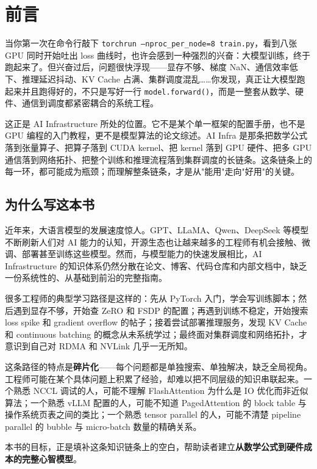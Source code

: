 \chapter*{前言}

当你第一次在命令行敲下 \texttt{torchrun --nproc\_per\_node=8 train.py}，看到八张 GPU 同时开始吐出 loss 曲线时，也许会感到一种强烈的兴奋：大模型训练，终于跑起来了。但兴奋过后，问题很快浮现——显存不够、梯度 NaN、通信效率低下、推理延迟抖动、KV Cache 占满、集群调度混乱……你发现，真正让大模型跑起来并且跑得好的，不只是写好一行 \texttt{model.forward()}，而是一整套从数学、硬件、通信到调度都紧密耦合的系统工程。

这正是 AI Infrastructure 所处的位置。它不是某个单一框架的配置手册，也不是 GPU 编程的入门教程，更不是模型算法的论文综述。AI Infra 是那条把数学公式落到张量算子、把算子落到 CUDA kernel、把 kernel 落到 GPU 硬件、把多 GPU 通信落到网络拓扑、把整个训练和推理流程落到集群调度的长链条。这条链条上的每一环，都可能成为瓶颈；而理解整条链条，才是从"能用"走向"好用"的关键。

\section*{为什么写这本书}

近年来，大语言模型的发展速度惊人。GPT、LLaMA、Qwen、DeepSeek 等模型不断刷新人们对 AI 能力的认知，开源生态也让越来越多的工程师有机会接触、微调、部署甚至训练这些模型。然而，与模型能力的快速发展相比，AI Infrastructure 的知识体系仍然分散在论文、博客、代码仓库和内部文档中，缺乏一份系统性的、从基础到前沿的完整指南。

很多工程师的典型学习路径是这样的：先从 PyTorch 入门，学会写训练脚本；然后遇到显存不够，开始查 ZeRO 和 FSDP 的配置；再遇到训练不稳定，开始搜索 loss spike 和 gradient overflow 的帖子；接着尝试部署推理服务，发现 KV Cache 和 continuous batching 的概念从未系统学过；最终面对集群调度和网络拓扑，才意识到自己对 RDMA 和 NVLink 几乎一无所知。

这条路径的特点是\textbf{碎片化}——每个问题都是单独搜索、单独解决，缺乏全局视角。工程师可能在某个具体问题上积累了经验，却难以把不同层级的知识串联起来。一个熟悉 NCCL 调试的人，可能不理解 FlashAttention 为什么是 IO 优化而非近似算法；一个熟悉 vLLM 配置的人，可能不知道 PagedAttention 的 block table 与操作系统页表之间的类比；一个熟悉 tensor parallel 的人，可能不清楚 pipeline parallel 的 bubble 与 micro-batch 数量的精确关系。

本书的目标，正是填补这条知识链条上的空白，帮助读者建立\textbf{从数学公式到硬件成本的完整心智模型}。

